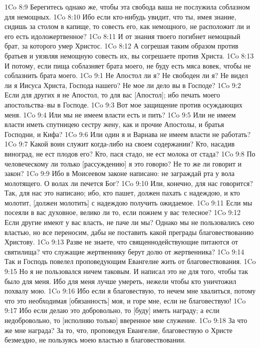 1Co 8:9  Берегитесь однако же, чтобы эта свобода ваша не послужила соблазном для немощных.
1Co 8:10  Ибо если кто-нибудь увидит, что ты, имея знание, сидишь за столом в капище, то совесть его, как немощного, не расположит ли и его есть идоложертвенное?
1Co 8:11  И от знания твоего погибнет немощный брат, за которого умер Христос.
1Co 8:12  А согрешая таким образом против братьев и уязвляя немощную совесть их, вы согрешаете против Христа.
1Co 8:13  И потому, если пища соблазняет брата моего, не буду есть мяса вовек, чтобы не соблазнить брата моего.
1Co 9:1  Не Апостол ли я? Не свободен ли я? Не видел ли я Иисуса Христа, Господа нашего? Не мое ли дело вы в Господе?
1Co 9:2  Если для других я не Апостол, то для вас [Апостол]; ибо печать моего апостольства--вы в Господе.
1Co 9:3  Вот мое защищение против осуждающих меня.
1Co 9:4  Или мы не имеем власти есть и пить?
1Co 9:5  Или не имеем власти иметь спутницею сестру жену, как и прочие Апостолы, и братья Господни, и Кифа?
1Co 9:6  Или один я и Варнава не имеем власти не работать?
1Co 9:7  Какой воин служит когда-либо на своем содержании? Кто, насадив виноград, не ест плодов его? Кто, пася стадо, не ест молока от стада?
1Co 9:8  По человеческому ли только [рассуждению] я это говорю? Не то же ли говорит и закон?
1Co 9:9  Ибо в Моисеевом законе написано: не заграждай рта у вола молотящего. О волах ли печется Бог?
1Co 9:10  Или, конечно, для нас говорится? Так, для нас это написано; ибо, кто пашет, должен пахать с надеждою, и кто молотит, [должен молотить] с надеждою получить ожидаемое.
1Co 9:11  Если мы посеяли в вас духовное, велико ли то, если пожнем у вас телесное?
1Co 9:12  Если другие имеют у вас власть, не паче ли мы? Однако мы не пользовались сею властью, но все переносим, дабы не поставить какой преграды благовествованию Христову.
1Co 9:13  Разве не знаете, что священнодействующие питаются от святилища? что служащие жертвеннику берут долю от жертвенника?
1Co 9:14  Так и Господь повелел проповедующим Евангелие жить от благовествования.
1Co 9:15  Но я не пользовался ничем таковым. И написал это не для того, чтобы так было для меня. Ибо для меня лучше умереть, нежели чтобы кто уничтожил похвалу мою.
1Co 9:16  Ибо если я благовествую, то нечем мне хвалиться, потому что это необходимая [обязанность] моя, и горе мне, если не благовествую!
1Co 9:17  Ибо если делаю это добровольно, то [буду] иметь награду; а если недобровольно, то [исполняю только] вверенное мне служение.
1Co 9:18  За что же мне награда? За то, что, проповедуя Евангелие, благовествую о Христе безмездно, не пользуясь моею властью в благовествовании.
